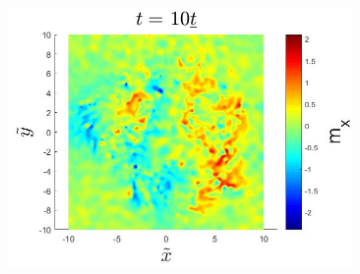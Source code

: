 \begin{figure}[h!]
\begin{subfigure}{.3\textwidth}
  \caption{}
  \label{fig:StaticSkyrmionMxT1}
\end{subfigure}
\begin{subfigure}{.3\textwidth}
  \centering
  \includegraphics[width=\linewidth]{Figures/StaticSkyrmionMxT10.jpg}
  \caption{}
  \label{fig:StaticSkyrmionMxT10}
\end{subfigure}


\end{figure}
